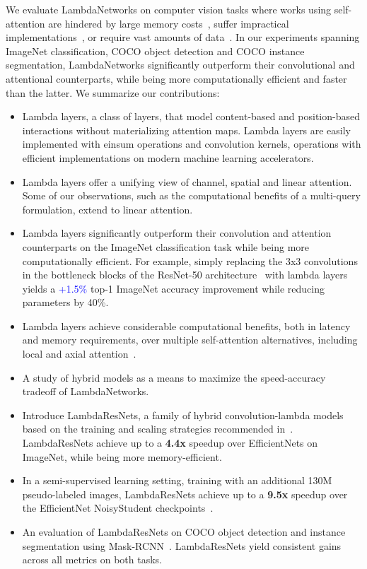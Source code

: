 \documentclass{article} \usepackage{iclr2021_conference,times}
\begin{document}
We evaluate LambdaNetworks on computer vision tasks where works using self-attention are hindered by large memory costs~\citep{wang2018non,bello2019aacn}, suffer impractical implementations~\citep{ramachandran2019sasa}, or require vast amounts of data~\citep{dosovitskiy2020image}.
In our experiments spanning ImageNet classification, COCO object detection and COCO instance segmentation, LambdaNetworks significantly outperform their convolutional and attentional counterparts, while being more computationally efficient and faster than the latter.
We summarize our contributions:
\begin{itemize}
    \item Lambda layers, a class of layers, that model content-based and position-based interactions without materializing attention maps.
    Lambda layers are easily implemented with einsum operations and convolution kernels, operations with efficient implementations on modern machine learning accelerators.
    \item Lambda layers offer a unifying view of channel, spatial and linear attention. Some of our observations, such as the computational benefits of a multi-query formulation, extend to linear attention.
    \item Lambda layers significantly outperform their convolution and attention counterparts on the ImageNet classification task while being more computationally efficient. 
    For example, simply replacing the 3x3 convolutions in the bottleneck blocks of the ResNet-50 architecture~\citep{he2015deep} with lambda layers yields a \textcolor{blue}{+1.5\%} top-1 ImageNet accuracy improvement while reducing parameters by 40\%.
    \item Lambda layers achieve considerable computational benefits, both in latency and memory requirements, over multiple self-attention alternatives, including local and axial attention~\citep{ramachandran2019sasa,wang2020axialdeeplab}.
    \item A study of hybrid models as a means to maximize the speed-accuracy tradeoff of LambdaNetworks.
    \item Introduce LambdaResNets, a family of hybrid convolution-lambda models based on the training and scaling strategies recommended in~\cite{bello2021revisiting}.
    LambdaResNets achieve up to a \textbf{4.4x} speedup over EfficientNets on ImageNet, while being more memory-efficient.
    \item In a semi-supervised learning setting, training with an additional 130M pseudo-labeled images, LambdaResNets achieve up to a \textbf{9.5x} speedup over the EfficientNet NoisyStudent checkpoints~\citep{xie2020selftraining}.
    \item An evaluation of LambdaResNets on COCO object detection and instance segmentation using Mask-RCNN~\citep{he2017mask}. LambdaResNets yield consistent gains across all metrics on both tasks.
\end{itemize}
\end{document}
